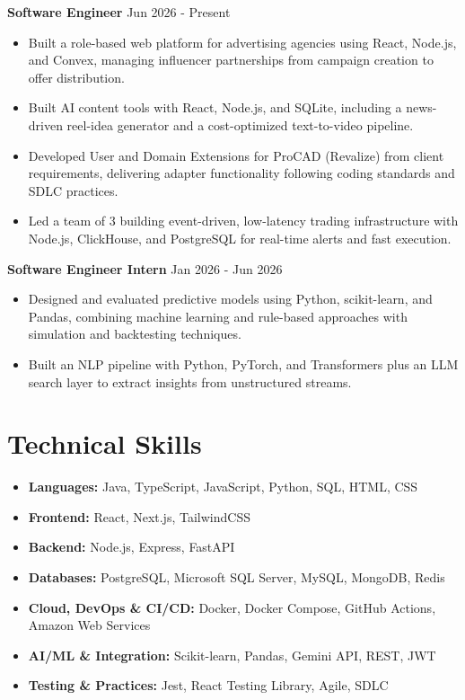 \documentclass[a4paper,11pt]{article}
\newcommand{\resumeItem}[1]{\item \small{#1}}
\newcommand{\resumeSubHeadingListStart}{\begin{itemize}}
\newcommand{\resumeSubHeadingListEnd}{\end{itemize}}
\begin{document}
\textbf{Software Engineer} \hfill {Jun 2026 - Present}
\resumeSubHeadingListStart
\resumeItem{Built a role-based web platform for advertising agencies using React, Node.js, and Convex, managing influencer partnerships from campaign creation to offer distribution.}
\resumeItem{Built AI content tools with React, Node.js, and SQLite, including a news-driven reel-idea generator and a cost-optimized text-to-video pipeline.}
\resumeItem{Developed User and Domain Extensions for ProCAD (Revalize) from client requirements, delivering adapter functionality following coding standards and SDLC practices.}
\resumeItem{Led a team of 3 building event-driven, low-latency trading infrastructure with Node.js, ClickHouse, and PostgreSQL for real-time alerts and fast execution.}
\resumeSubHeadingListEnd

\textbf{Software Engineer Intern} \hfill {Jan 2026 - Jun 2026}
\resumeSubHeadingListStart
\resumeItem{Designed and evaluated predictive models using Python, scikit-learn, and Pandas, combining machine learning and rule-based approaches with simulation and backtesting techniques.}
\resumeItem{Built an NLP pipeline with Python, PyTorch, and Transformers plus an LLM search layer to extract insights from unstructured streams.}
\resumeSubHeadingListEnd


\section*{Technical Skills}
\begin{itemize}
\item \textbf{Languages:} Java, TypeScript, JavaScript, Python, SQL, HTML, CSS
\item \textbf{Frontend:} React, Next.js, TailwindCSS
\item \textbf{Backend:} Node.js, Express, FastAPI
\item \textbf{Databases:} PostgreSQL, Microsoft SQL Server, MySQL, MongoDB, Redis
\item \textbf{Cloud, DevOps \& CI/CD:} Docker, Docker Compose, GitHub Actions, Amazon Web Services
\item \textbf{AI/ML \& Integration:} Scikit-learn, Pandas, Gemini API, REST, JWT
\item \textbf{Testing \& Practices:} Jest, React Testing Library, Agile, SDLC
\end{itemize}
\vspace{-0.2em}
\end{document}
